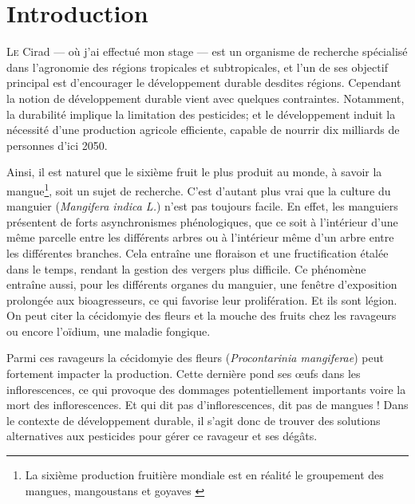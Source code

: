 \chapter{Introduction}

\lettrine{L}{e} Cirad --- où j'ai effectué mon stage --- est un organisme de recherche spécialisé dans l'agronomie des régions tropicales et subtropicales, et l'un de ses objectif principal est d'encourager le développement durable desdites régions.
Cependant la notion de développement durable vient avec quelques contraintes.
Notamment, la durabilité implique la limitation des pesticides; et le développement induit la nécessité d'une production agricole efficiente, capable de nourrir dix milliards de personnes d'ici 2050.

Ainsi, il est naturel que le sixième fruit le plus produit au monde, à savoir la mangue\footnote{La sixième production fruitière mondiale est en réalité le groupement des mangues, mangoustans et goyaves \citep{fao}}, soit un sujet de recherche.
C'est d'autant plus vrai que la culture du manguier (\emph{Mangifera indica L.}) n'est pas toujours facile.
En effet, les manguiers présentent de forts asynchronismes phénologiques, que ce soit à l'intérieur d'une même parcelle entre les différents arbres ou à l'intérieur même d'un arbre entre les différentes branches.
Cela entraîne une floraison et une fructification étalée dans le temps, rendant la gestion des vergers plus difficile.
Ce phénomène entraîne aussi, pour les différents organes du manguier, une fenêtre d'exposition prolongée aux bioagresseurs, ce qui favorise leur prolifération.
Et ils sont légion.
On peut citer la cécidomyie des fleurs et la mouche des fruits chez les ravageurs ou encore l'oïdium, une maladie fongique.

Parmi ces ravageurs la cécidomyie des fleurs (\emph{Procontarinia mangiferae}) peut fortement impacter la production.
Cette dernière pond ses œufs dans les inflorescences, ce qui provoque des dommages potentiellement importants voire la mort des inflorescences. 
Et qui dit pas d'inflorescences, dit pas de mangues !
Dans le contexte de développement durable, il s'agit donc de trouver des solutions alternatives aux pesticides pour gérer ce ravageur et ses dégâts.


